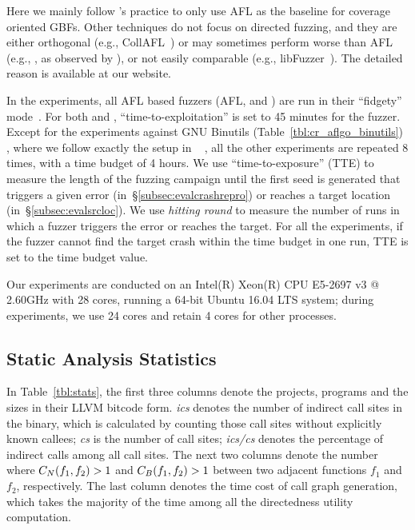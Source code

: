 Here we mainly follow \aflgo's practice to only use AFL as the baseline for coverage oriented GBFs. Other techniques do not focus on directed fuzzing, and they are either orthogonal (e.g., CollAFL~\cite{CollAFL}) or may sometimes perform worse than AFL (e.g., \aflfast, as observed by \cite{Shastry:LNCS2017:Orthrus}), or not easily comparable (e.g., libFuzzer~\cite{libfuzzer}). The detailed reason is available at our website. %

In the experiments, all AFL based fuzzers (AFL, {\aflgo} and {\dGO}) are run in their ``fidgety'' mode~\cite{FidgetyAFL}. For both {\aflgo} and {\dGO}, ``time-to-exploitation'' is set to 45 minutes for the fuzzer. Except for the experiments against GNU Binutils (Table~\ref{tbl:cr_aflgo_binutils}) , where we follow exactly the setup in {\aflgo}~\cite{Bohme:2017:DGF} , all the other experiments are repeated 8 times, with a time budget of 4 hours. 
We use ``time-to-exposure'' (TTE) to measure the length of the
fuzzing campaign until the first seed is generated that triggers a given error (in~\S\ref{subsec:evalcrashrepro}) or reaches a target location (in~\S\ref{subsec:evalsrcloc}).
We use \emph{hitting round} to measure the number of runs in which a fuzzer triggers the error or reaches the target.
For all the experiments, if the fuzzer cannot find the target crash within the time budget in one run, TTE is set to the time budget value. 

Our experiments are conducted on an Intel(R) Xeon(R) CPU E5-2697 v3 @ 2.60GHz with 28 cores, running a 64-bit Ubuntu 16.04 LTS system; during experiments, we use 24 cores and retain 4 cores for other processes. 


\subsection{Static Analysis Statistics}\label{subsec:evalstatic}


In Table~\ref{tbl:stats}, the first three columns denote the projects, programs and the sizes in their LLVM bitcode form. \emph{ics} denotes the number of indirect call sites in the binary, which is calculated by counting those call sites without explicitly known callees; \emph{cs} is the number of call sites; \emph{ics/cs} denotes the percentage of indirect calls among all call sites. 
The next two columns denote the number where $C_N(f_1, f_2)>1$ and $C_B(f_1, f_2)>1$ between two adjacent functions $f_1$ and $f_2$, respectively. The last column denotes the time cost of call graph generation, which takes the majority of the time among all the directedness utility computation.



